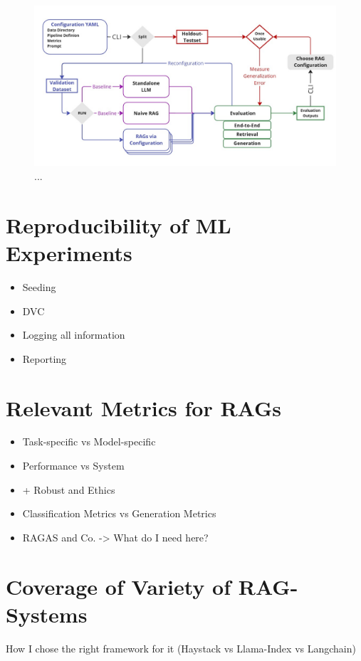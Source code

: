
\begin{figure}[!ht]
    \centering
    \includegraphics[width=\textwidth]{images/Sketch.pdf}
    \caption{...}
    \label{fig:EvaluationDesign}
\end{figure}


\section{Reproducibility of ML Experiments}
\begin{itemize}
    \item Seeding
    \item DVC 
    \item Logging all information
    \item Reporting
\end{itemize}

\section{Relevant Metrics for RAGs}
\begin{itemize}
    \item Task-specific vs Model-specific
    \item Performance vs System
    \item + Robust and Ethics
    \item Classification Metrics vs Generation Metrics
    \item RAGAS and Co. -> What do I need here?
\end{itemize}

\section{Coverage of Variety of RAG-Systems}

How I chose the right framework for it (Haystack vs Llama-Index vs Langchain)


